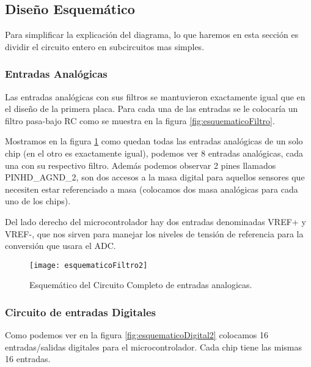 \subsection{Diseño Esquemático}
\label{sub: diseño_esquematico2}

Para simplificar la explicación del diagrama, lo que haremos en esta sección es dividir el circuito entero en subcircuitos mas simples.

\subsubsection{Entradas Analógicas}
\label{subsub: entradas_analogicas2}

Las entradas analógicas con sus filtros se mantuvieron exactamente igual que en el diseño de la primera placa. Para cada una de las entradas se le colocaría un filtro pasa-bajo RC como se muestra en la figura \ref{fig:esquematicoFiltro}.

Mostramos en la figura \ref{fig:esquematicoFiltro2} como quedan todas las entradas analógicas de un solo chip (en el otro es exactamente igual), podemos ver 8 entradas analógicas, cada una con su respectivo filtro. Además podemos observar 2 pines llamados PINHD\_AGND\_2, son dos accesos a la masa digital para aquellos sensores que necesiten estar referenciado a masa (colocamos dos masa analógicas para cada uno de los chips).

Del lado derecho del microcontrolador hay dos entradas denominadas VREF+ y VREF-, que nos sirven para manejar los niveles de tensión de referencia para la conversión que usara el ADC.

\begin{figure}[H]
\centering
  \texttt{[image: esquematicoFiltro2]}
  \caption{Esquemático del Circuito Completo de entradas analogicas.}\label{fig:esquematicoFiltro2}
\end{figure}


\subsubsection{Circuito de entradas Digitales}
\label{subsub:entradas_digitales}

Como podemos ver en la figura \ref{fig:esquematicoDigital2} colocamos 16 entradas/salidas digitales para el microcontrolador. Cada chip tiene las mismas 16 entradas.

